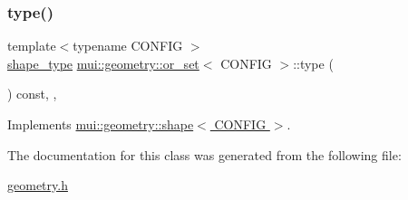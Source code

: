\subsubsection{\texorpdfstring{type()}{type()}}
{\footnotesize\ttfamily template$<$typename C\+O\+N\+F\+IG $>$ \\
\hyperlink{namespacemui_1_1geometry_a5f311a343181e2f20482e5c9afb0f136}{shape\+\_\+type} \hyperlink{classmui_1_1geometry_1_1or__set}{mui\+::geometry\+::or\+\_\+set}$<$ C\+O\+N\+F\+IG $>$\+::type (\begin{DoxyParamCaption}{ }\end{DoxyParamCaption}) const\hspace{0.3cm}{\ttfamily [inline]}, {\ttfamily [virtual]}, {\ttfamily [noexcept]}}



Implements \hyperlink{classmui_1_1geometry_1_1shape_a4a0fe17b8ca5cc29e260cb38c9fcf8fe}{mui\+::geometry\+::shape$<$ C\+O\+N\+F\+I\+G $>$}.



The documentation for this class was generated from the following file\+:\begin{DoxyCompactItemize}
\item 
\hyperlink{geometry_8h}{geometry.\+h}\end{DoxyCompactItemize}
